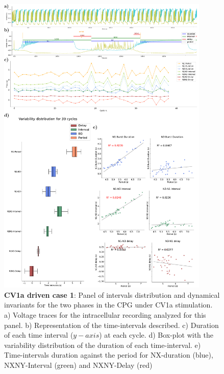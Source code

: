 \begin{figure}[htbp]
	\centering
	\includegraphics[width=0.9\textwidth]{./img/invariants/data/SUSSEX/CV1a_driven1/images/2phases/panel_with_intervals.pdf}
	\caption{\textbf{CV1a driven case 1}: Panel of intervals distribution and dynamical invariants for the two phases in the CPG under CV1a stimulation. a) Voltage traces for the intracellular recording analyzed for this panel. b) Representation of the time-intervals described. c) Duration of each time interval ($y-axis$) at each cycle. d) Box-plot with the variability distribution of the duration of each time-interval. e) Time-intervals duration against the period for NX-duration (blue), NXNY-Interval (green) and NXNY-Delay (red)}
	\label{fig:cv1a 1 2phases}
\end{figure}



